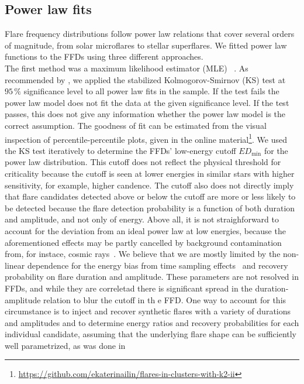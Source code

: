 \documentclass{aa}
\begin{document}
\subsection{Power law fits}
\label{powerlawfits}
Flare frequency distributions follow power law relations that cover several orders of magnitude, from solar microflares to stellar superflares. We fitted power law functions to the FFDs using three different approaches.
\\
The first method was a maximum likelihood estimator (MLE)~ \citep{maschberger_powerlaw_2009}. As recommended by \citet{maschberger_powerlaw_2009}, we applied the stabilized Kolmogorov-Smirnov (KS) test at $95\,\%$ significance level to all power law fits in the sample. If the test fails the power law model does not fit the data at the given significance level. If the test passes, this does not give any information whether the power law model is the correct assumption. The goodness of fit can be estimated from the visual inspection of percentile-percentile plots, given in the online material\footnote{\url{https://github.com/ekaterinailin/flares-in-clusters-with-k2-ii}}. We used the KS test iteratively to determine the FFDs' low-energy cutoff $ED_\mathrm{min}$ for the power law distribution. This cutoff does not reflect the physical threshold for criticality because the cutoff is seen at lower energies in similar stars with higher sensitivity, for example, higher candence. The cutoff also does not directly imply that flare candidates detected above or below the cutoff are more or less likely to be detected because the flare detection probability is a function of both duration and amplitude, and not only of energy. Above all, it is not straighforward to account for the deviation from an ideal power law at low energies, because the aforementioned effects may be partly cancelled by background contamination from, for instace, cosmic rays~\citep{aschwanden_powerlaws_2015}.  We believe that we are mostly limited by the non-linear dependence for the energy bias from time sampling effects~\citep{yang_flaresampling_2018} and recovery probability on flare duration and amplitude. These parameters are not resolved in FFDs, and while they are correletad there is significant spread in the duration-amplitude relation to blur the cutoff in th e FFD. One way to account for this circumstance is to inject and recover synthetic flares with a variety of durations and amplitudes and to determine energy ratios and recovery probabilities for each individual candidate, assuming that the underlying flare shape can be sufficiently well parametrized, as was done in~\citet{davenport_kepler_2014}
\end{document}
